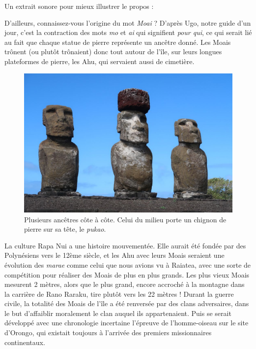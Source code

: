 Un extrait sonore pour mieux illustrer le propos :

D'ailleurs, connaissez-vous l'origine du mot \emph{Moai} ? D'après Ugo,
notre guide d'un jour, c'est la contraction des mots \emph{mo} et
\emph{ai} qui signifient \emph{pour qui}, ce qui serait lié au fait que
chaque statue de pierre représente un ancêtre donné. Les Moais trônent
(ou plutôt trônaient) donc tout autour de l'île, sur leurs longues
plateformes de pierre, les Ahu, qui servaient aussi de cimetière.

\begin{figure}
\centering
\includegraphics{images/20180827_moai.JPG}
\caption{Plusieurs ancêtres côte à côte. Celui du milieu porte un
chignon de pierre sur sa tête, le \emph{pukao}.}
\end{figure}

La culture Rapa Nui a une histoire mouvementée. Elle aurait été fondée
par des Polynésiens vers le 12ème siècle, et les Ahu avec leurs Moais
seraient une évolution des \emph{marae} comme celui que nous avions vu à
Raiatea, avec une sorte de compétition pour réaliser des Moais de plus
en plus grands. Les plus vieux Moais mesurent 2 mètres, alors que le
plus grand, encore accroché à la montagne dans la carrière de Rano
Raraku, tire plutôt vers les 22 mètres ! Durant la guerre civile, la
totalité des Moais de l'île a été renversée par des clans adversaires,
dans le but d'affaiblir moralement le clan auquel ils appartenaient.
Puis se serait développé avec une chronologie incertaine l'épreuve de
l'homme-oiseau sur le site d'Orongo, qui existait toujours à l'arrivée
des premiers missionnaires continentaux.

